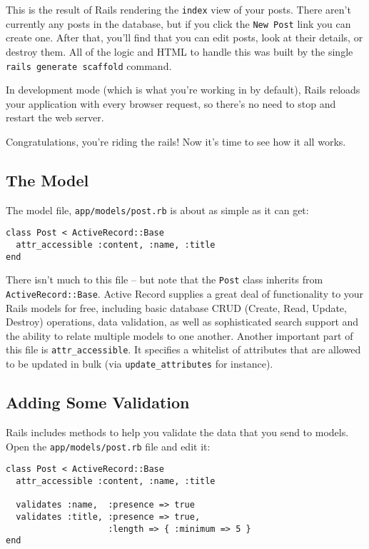 \documentclass[10pt]{book}
\begin{document}
This is the result of Rails rendering the \texttt{index} view of your posts. There aren’t currently any posts in the database, but if you click the \texttt{New Post} link you can create one. After that, you’ll find that you can edit posts, look at their details, or destroy them. All of the logic and HTML to handle this was built by the single \texttt{rails generate scaffold} command.

In development mode (which is what you’re working in by default), Rails reloads your application with every browser request, so there’s no need to stop and restart the web server.

Congratulations, you’re riding the rails! Now it’s time to see how it all works.

\subsection{ The Model}

The model file, \texttt{app/models/post.rb} is about as simple as it can get:
\begin{verbatim}
class Post < ActiveRecord::Base
  attr_accessible :content, :name, :title
end
\end{verbatim}

There isn’t much to this file – but note that the \texttt{Post} class inherits from \texttt{ActiveRecord::Base}. Active Record supplies a great deal of functionality to your Rails models for free, including basic database CRUD (Create, Read, Update, Destroy) operations, data validation, as well as sophisticated search support and the ability to relate multiple models to one another. Another important part of this file is \texttt{attr\_accessible}. It specifies a whitelist of attributes that are allowed to be updated in bulk (via \texttt{update\_attributes} for instance).

\subsection{ Adding Some Validation}

Rails includes methods to help you validate the data that you send to models. Open the \texttt{app/models/post.rb} file and edit it:


\begin{verbatim}
class Post < ActiveRecord::Base
  attr_accessible :content, :name, :title
 
  validates :name,  :presence => true
  validates :title, :presence => true,
                    :length => { :minimum => 5 }
end
\end{verbatim}
\end{document}
